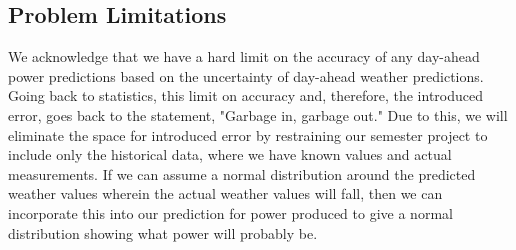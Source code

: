 \documentclass[sigconf]{acmart}
\begin{document}
\subsection{Problem Limitations}
We acknowledge that we have a hard limit on the accuracy of any day-ahead power predictions based on the uncertainty of day-ahead weather predictions.  Going back to statistics, this limit on accuracy and, therefore, the introduced error, goes back to the statement, "Garbage in, garbage out."  Due to this, we will eliminate the space for introduced error by restraining our semester project to include only the historical data, where we have known values and actual measurements.  If we can assume a normal distribution around the predicted weather values wherein the actual weather values will fall, then we can incorporate this into our prediction for power produced to give a normal distribution showing what power will probably be.

\end{document}
